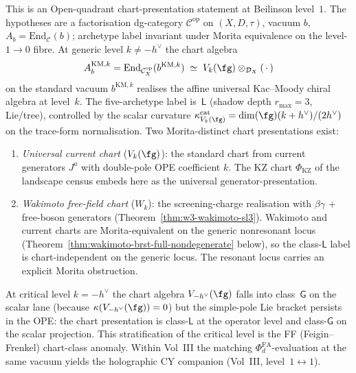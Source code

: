 \begin{remark}
\label{rem:km-chart-class-enumeration}
This is an Open-quadrant chart-presentation statement at Beilinson
level~$1$. The hypotheses are a factorisation dg-category
$\mathcal{C}^{\mathrm{op}}$ on $(X, D, \tau)$, vacuum $b$,
$A_b = \mathrm{End}_\mathcal{C}(b)$; archetype label invariant
under Morita equivalence on the level-$1\to 0$ fibre.
At generic level $k\neq -h^\vee$ the chart algebra
\[
A_b^{\mathrm{KM}, k} = \mathrm{End}_{\mathcal{C}^{\mathrm{op}}_X}(b^{\mathrm{KM},k})
\;\simeq\; V_k(\fg)\otimes_{\mathcal{D}_X}(\,\cdot\,)
\]
on the standard vacuum $b^{\mathrm{KM},k}$ realises the affine
universal Kac--Moody chiral algebra at level~$k$.
The five-archetype label is~$\mathsf{L}$
(shadow depth $r_{\max}=3$, Lie/tree),
controlled by the scalar curvature
$\kappa^{\mathrm{cat}}_{V_k(\fg)} = \dim(\fg)(k+h^\vee)/(2h^\vee)$
on the trace-form normalisation. Two Morita-distinct chart
presentations exist:
\begin{enumerate}[label=\textup{(L\arabic*)}]
\item \emph{Universal current chart} ($V_k(\fg)$): the standard
chart from current generators $J^a$ with double-pole OPE
coefficient $k$. The KZ chart $\Phi_{\mathrm{KZ}}$ of the
landscape census embeds here as the universal generator-presentation.
\item \emph{Wakimoto free-field chart} ($W_k$): the screening-charge
realisation with $\beta\gamma$ + free-boson generators
(Theorem~\ref{thm:w3-wakimoto-sl3}). Wakimoto and current charts
are Morita-equivalent on the generic nonresonant locus
(Theorem~\ref{thm:wakimoto-brst-full-nondegenerate} below), so the
class-$\mathsf{L}$ label is chart-independent on the generic locus.
The resonant locus carries an explicit Morita obstruction.
\end{enumerate}
At critical level $k=-h^\vee$ the chart algebra $V_{-h^\vee}(\fg)$
falls into class~$\mathsf{G}$ on the scalar lane (because
$\kappa(V_{-h^\vee}(\fg))=0$) but the simple-pole Lie bracket
persists in the OPE: the chart presentation is class-$\mathsf{L}$
at the operator level and class-$\mathsf{G}$ on the scalar projection.
This stratification of the critical level is the FF
(Feigin--Frenkel) chart-class anomaly. Within Vol~III the matching
$\Phi_d^{\mathrm{FA}}$-evaluation at the same vacuum yields the
holographic CY companion (Vol~III, level~$1\leftrightarrow 1$).
\end{remark}

